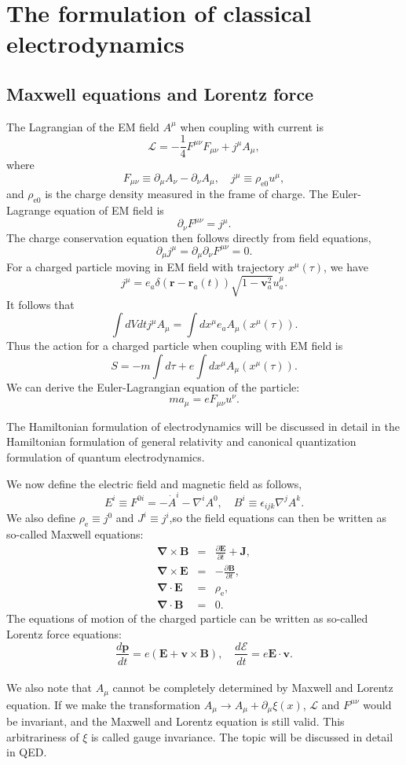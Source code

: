 \section{The formulation of classical electrodynamics}
\subsection{Maxwell equations and Lorentz force}
The Lagrangian of the EM field $A^{\mu}$ when coupling with current is
\[\mathcal{L} = -\frac{1}{4}F^{\mu\nu}F_{\mu\nu} + j^{\mu} A_{\mu},\]
where
\[F_{\mu\nu} \equiv \partial_{\mu}A_{\nu} - \partial_{\nu}A_{\mu} , \quad j^{\mu} \equiv \rho_{\mathrm{e}0} u^{\mu},\]
and $\rho_{\mathrm{e}0}$ is the charge density measured in the frame of charge.
The Euler-Lagrange equation of EM field is
\[\partial_{\nu} F^{\mu\nu} = j^{\mu}.\]
The charge conservation equation then follows directly from field equations,
\[\partial_{\mu} j^{\mu} = \partial_{\mu} \partial_{\nu} F^{\mu\nu} = 0.\]
For a charged particle moving in EM field with trajectory $x^{\mu}(\tau)$, we have
\[j^{\mu} =  e_a \delta(\bm{r}-\bm{r}_a(t)) \sqrt{1-\bm{v}_a^2} u_a^\mu .\]
It follows that
\[\int dV dt j^{\mu} A_{\mu} = \int dx^{\mu} e_a A_{\mu}(x^{\mu}(\tau)).\]
Thus the action for a charged particle when coupling with EM field is
\[S = - m \int d\tau + e\int dx^{\mu} A_{\mu}(x^{\mu}(\tau)).\]
We can derive the Euler-Lagrangian equation of the particle:
\[ma_{\mu} = eF_{\mu \nu}u^{\nu}.\]
\begin{note}
The Hamiltonian formulation of electrodynamics will be discussed in detail in the Hamiltonian formulation of general relativity and canonical quantization formulation of quantum electrodynamics.
\end{note}
\noindent
We now define the electric field and magnetic field as follows,
\[E^i \equiv F^{0i} = -\dot{A}^i - \nabla^i A^0 , \quad B^i \equiv \epsilon_{ijk} \nabla^j A^k.\]
We also define $\rho_{\mathrm{e}} \equiv j^0$ and $J^i \equiv j^i$,so
the field equations can then be written as so-called Maxwell equations:
\begin{eqnarray}
	\bm{\nabla} \times  \bm{B} &=& \frac{\partial \bm{E}}{\partial t} +  \bm{J} ,\nonumber \\
	\bm{\nabla} \times \bm{E} &=& -\frac{\partial \bm{B}}{\partial t} ,\nonumber \\
	\bm{\nabla} \cdot \bm{E} &=& \rho_{\mathrm{e}}, \nonumber \\
	\bm{\nabla} \cdot \bm{B} &=& 0 .\nonumber
\end{eqnarray}
The equations of motion of the charged particle can be written as so-called Lorentz force equations:
\[\frac{d\bm{p}}{dt} = e(\bm{E} + \bm{v} \times \bm{B}) , \quad \frac{d \mathcal{E}}{dt} = e \bm{E} \cdot \bm{v}.\]
\\
We also note that $A_{\mu}$ cannot be completely determined by Maxwell and Lorentz equation. If we make the transformation $A_{\mu} \to A_{\mu} + \partial_{\mu} \xi(x)$, $\mathcal{L}$ and $F^{\mu\nu}$ would be invariant, and the Maxwell and Lorentz equation is still valid. This arbitrariness of $\xi$ is called gauge invariance. The topic will be discussed in detail in QED.

